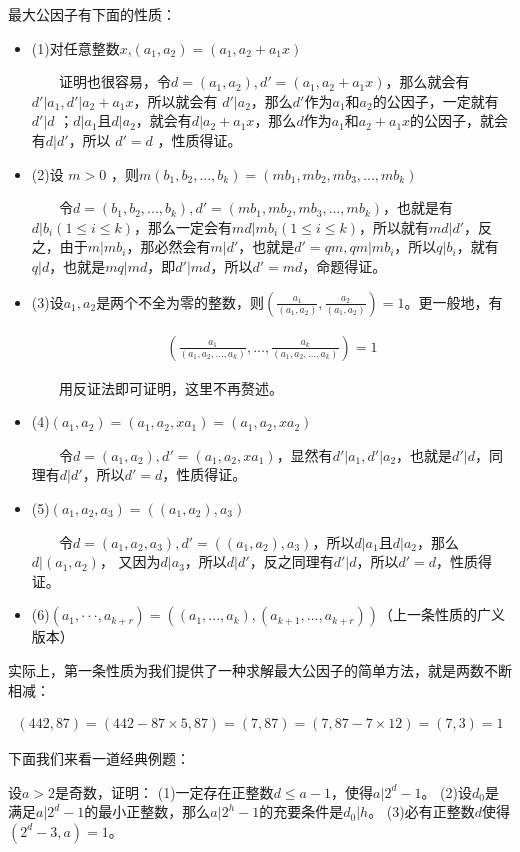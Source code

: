 \documentclass[12pt, a4paper, oneside]{ctexart}
\begin{document}
最大公因子有下面的性质：
\begin{itemize}
\item (1)对任意整数$x$,$(a_1,a_2)=(a_1,a_2+a_1x)$

$\;\;\;\;\;\;\;$证明也很容易，令$d=(a_1,a_2),d'=(a_1,a_2+a_1x)$，那么就会有$d'|a_1,d'|a_2+a_1x$，所以就会有 $d'|a_2$，那么$d'$作为$a_1$和$a_2$的公因子，一定就有$d'|d$ ；$d|a_1$且$d|a_2$，就会有$d|a_2+a_1x$，那么$d$作为$a_1$和$a_2+a_1x$的公因子，就会有$d|d'$，所以 $d'=d$ ，性质得证。
\item (2)设 $m>0$ ，则$m(b_1,b_2,...,b_k)=(mb_1,mb_2,mb_3,...,mb_k)$

$\;\;\;\;\;\;\;$令$d=(b_1,b_2,...,b_k),d'=(mb_1,mb_2,mb_3,...,mb_k)$，也就是有$d|b_i(1\leqslant i\leqslant k)$，那么一定会有$md|mb_i(1\leqslant i\leqslant k)$，所以就有$md|d'$，反之，由于$m|mb_i$，那必然会有$m|d'$，也就是$d'=qm,qm|mb_i$，所以$q|b_i$，就有$q|d$，也就是$mq|md$，即$d'|md$，所以$d'=md$，命题得证。
\item (3)设$a_1,a_2$是两个不全为零的整数，则$(\frac{a_1}{(a_1,a_2)},\frac{a_2}{(a_1,a_2)})=1$。更一般地，有

$$\begin{align*}
(\frac{a_1}{(a_1,a_2,...,a_k)},...,\frac{a_k}{(a_1,a_2,...,a_k)})=1
\end{align*}$$

$\;\;\;\;\;\;\;$用反证法即可证明，这里不再赘述。
\item (4)$(a_1,a_2)=(a_1,a_2,xa_1)=(a_1,a_2,xa_2)$

$\;\;\;\;\;\;\;$令$d=(a_1,a_2),d'=(a_1,a_2,xa_1)$，显然有$d'|a_1,d'|a_2$，也就是$d'|d$，同理有$d|d'$，所以$d'=d$，性质得证。
\item (5)$(a_1,a_2,a_3)=((a_1,a_2),a_3)$   

$\;\;\;\;\;\;\;$令$d=(a_1,a_2,a_3),d'=((a_1,a_2),a_3)$，所以$d|a_1$且$d|a_2$，那么$d|(a_1,a_2)$， 又因为$d|a_3$，所以$d|d'$，反之同理有$d'|d$，所以$d'=d$，性质得证。 
\item (6)$(a_1,··· ,a_{k+r})=((a_1,...,a_k),(a_{k+1},...,a_{k+r}))$（上一条性质的广义版本）  
\end{itemize}
实际上，第一条性质为我们提供了一种求解最大公因子的简单方法，就是两数不断相减：

$$\begin{align*}
(442,87)=(442-87\times5,87)=(7,87)=(7,87-7\times12)=(7,3)=1
\end{align*}$$

下面我们来看一道经典例题：

设$a>2$是奇数，证明：  
(1)一定存在正整数$d\leqslant a-1$，使得$a|2^d-1$。  
(2)设$d_0$是满足$a|2^d-1$的最小正整数，那么$a|2^h-1$的充要条件是$d_0|h$。  
(3)必有正整数$d$使得$(2^d-3,a)=1$。  
\end{document}
